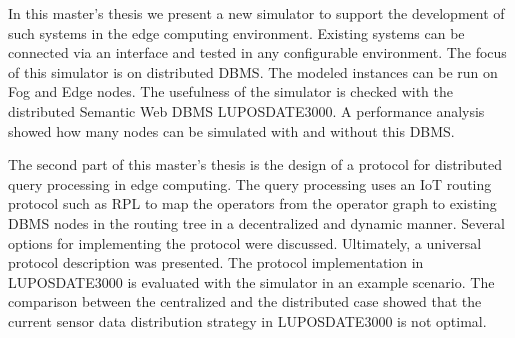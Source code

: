 \documentclass[english,version-2019-11]{uzl-thesis}
\begin{document}
In this master's thesis we present a new simulator to support the development of such systems in the edge computing environment. Existing systems can be connected via an interface and tested in any configurable environment. The focus of this simulator is on distributed DBMS. The modeled instances can be run on Fog and Edge nodes. The usefulness of the simulator is checked with the distributed Semantic Web DBMS LUPOSDATE3000. A performance analysis showed how many nodes can be simulated with and without this DBMS.

The second part of this master's thesis is the design of a protocol for distributed query processing in edge computing. The query processing uses an IoT routing protocol such as RPL to map the operators from the operator graph to existing DBMS nodes in the routing tree in a decentralized and dynamic manner. Several options for implementing the protocol were discussed. Ultimately, a universal protocol description was presented. The protocol implementation in LUPOSDATE3000 is evaluated with the simulator in an example scenario. The comparison between the centralized and the distributed case showed that the current sensor data distribution strategy in LUPOSDATE3000 is not optimal.
\end{document}
